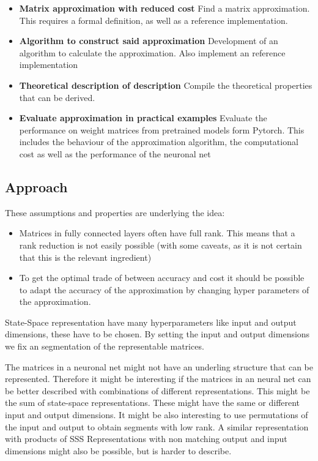 \documentclass[lang=ngerman,inputenc=utf8,fontsize=10pt]{ldvarticle}
\begin{document}
\begin{itemize}

	\item\textbf{Matrix approximation with reduced cost} Find a matrix approximation. This requires a formal definition, as well as a reference implementation.
	\item\textbf{Algorithm to construct said approximation} Development of an algorithm to calculate the approximation. Also implement an reference implementation
	\item\textbf{Theoretical description of description} Compile the theoretical properties that can be derived.
	\item\textbf{Evaluate approximation in practical examples} Evaluate the performance on weight matrices from pretrained models form Pytorch. This includes the behaviour of the approximation algorithm, the computational cost as well as the performance of the neuronal net
\end{itemize}





\subsection*{Approach}

These assumptions and properties are underlying the idea:
\begin{itemize}
	\item Matrices in fully connected layers often have full rank. This means that a rank reduction is not easily possible (with some caveats, as it is not certain that this is the relevant ingredient) \cite{martin_implicit_2018}
	\item To get the optimal trade of between accuracy and cost it should be possible to adapt the accuracy of the approximation by changing hyper parameters of the approximation.
\end{itemize}

State-Space representation have many hyperparameters like input and output dimensions, these have to be chosen. By setting the input and output dimensions we fix an segmentation of the representable matrices.

The matrices in a neuronal net might not have an underling structure that can be represented.
Therefore it might be interesting if the matrices in an neural net can be better described with combinations of different representations.
This might be the sum of state-space representations. These might have the same or different input and output dimensions.
It might be also interesting to use permutations of the input and output to obtain segments with low rank.
A similar representation with products of SSS Representations with non matching output and input dimensions might also be possible, but is harder to describe.
\end{document}
